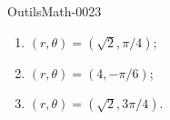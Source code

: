 
\begin{corrige}{OutilsMath-0023}

	\begin{enumerate}
		\item
			$(r,\theta)=(\sqrt{2},\pi/4)$;
		\item
			$(r,\theta)=(4,-\pi/6)$;
		\item
			$(r,\theta)=(\sqrt{2},3\pi/4)$.
	\end{enumerate}

\end{corrige}
